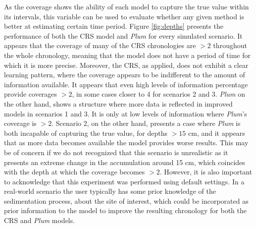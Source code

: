 \documentclass [10pt] {article}
\begin{document}
As the coverage shows the ability of each model to capture the true value within its intervals, this variable can be used to evaluate whether any given method is better at estimating certain time period.
Figure \ref{fig:depths} presents the performance of both the CRS model and \textit{Plum} for every simulated scenario.
It appears that the coverage of many of the CRS chronologies are $> 2$ throughout the whole chronology, meaning that the model does not have a period of time for which it is more precise. 
Moreover, the CRS, as applied, does not exhibit a clear learning pattern, where the coverage appears to be indifferent to the amount of information available.
It appears that even high levels of information percentage provide coverages $> 2$, in some cases closer to 4 for scenarios 2 and 3.
\textit{Plum} on the other hand, shows a structure where more data is reflected in improved models in scenarios 1 and 3.
It is only at low levels of information where \textit{Plum}'s coverage is $>2$.
Scenario 2, on the other hand, presents a case where \textit{Plum} is both incapable of capturing the true value, for depths $>15$ cm, and it appears that as more data becomes available the model provides worse results. 
This may be of concern if we do not recognized that this scenario is unrealistic as it presents an extreme change in the accumulation around 15 cm, which coincides with the depth at which the coverage becomes $>2$.
However, it is also important to acknowledge that this experiment was performed using default settings.  
In a real-world scenario the user typically has some prior knowledge of the sedimentation process, about the site of interest, which could be incorporated as prior information to the model to improve the resulting chronology for both the CRS and \textit{Plum} models.

\end{document}
